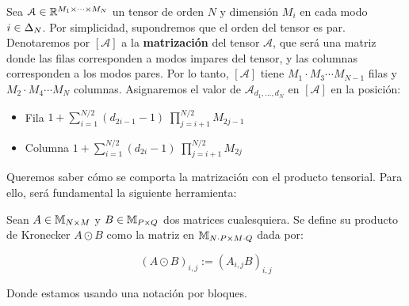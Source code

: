 \begin{definicion}

Sea $\mathcal{A} \in \mathbb{R}^{M_1 \times \cdots \times M_N}$ un tensor de orden $N$ y dimensión $M_i$ en cada modo $i \in \Delta_{N}$. Por simplicidad, supondremos que el orden del tensor es par. Denotaremos por $[\mathcal{A}]$ a la \textbf{matrización} del tensor $\mathcal{A}$, que será una matriz donde las filas corresponden a modos impares del tensor, y las columnas corresponden a los modos pares. Por lo tanto, $[\mathcal{A}]$ tiene $M_1 \cdot M_3 \cdots M_{N-1}$ filas y $M_2 \cdot M_4 \cdots M_N$ columnas. Asignaremos el valor de $\mathcal{A}_{d_1, \ldots, d_N}$ en $[\mathcal{A}]$ en la posición:

\begin{itemize}
    \item Fila $1 + \sum_{i = 1}^{N/2} (d_{2i - 1} - 1) \; \prod_{j = i + 1}^{N/2} M_{2j - 1}$
    \item Columna $1 + \sum_{i = 1}^{N/2} (d_{2i} - 1) \; \prod_{j = i + 1}^{N/2} M_{2j}$
\end{itemize}

\end{definicion}

Queremos saber cómo se comporta la matrización con el producto tensorial. Para ello, será fundamental la siguiente herramienta:

\begin{definicion}

    Sean $A \in \mathbb{M}_{N \times M}$ y  $B \in \mathbb{M}_{P \times Q}$ dos matrices cualesquiera. Se define su producto de Kronecker $A \odot B$ como la matriz en $\mathbb{M}_{N \cdot P \times M \cdot Q}$ dada por:

    \begin{equation}
        (A \odot B)_{i,j} := (A_{i, j} B)_{i, j}
    \end{equation}

    Donde estamos usando una notación por bloques.
\end{definicion}

